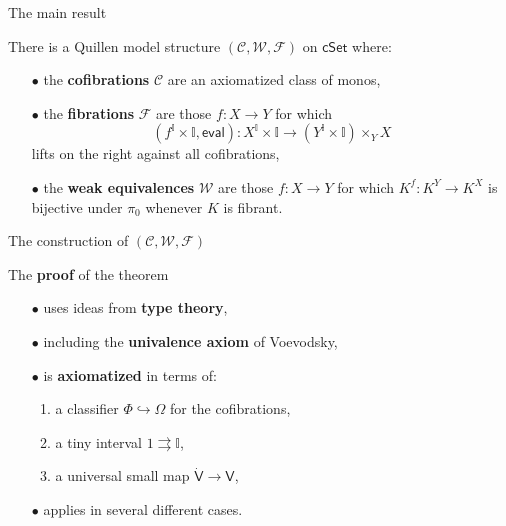 \documentclass[handout]{beamer}
\newcommand{\myemph}[1]{\textbf{#1}}    %
\newcommand{\C}{\ensuremath{\mathbb{C}}}
\newcommand{\Set}{\ensuremath{\mathsf{Set}}}
\newcommand{\cSet}{\ensuremath{\mathsf{cSet}}}
\newcommand{\ra}{\ensuremath{\rightarrow}}
\newcommand{\V}{\mathsf{V}}
\newcommand{\II}{\mathbb{I}}
\theoremstyle{remark}
\begin{document}
\begin{frame}{The main result}

\begin{theorem}[A.~2023]
There is a Quillen model structure $(\mathcal{C},\mathcal{W},\mathcal{F})$ on $\mathsf{cSet}$ where:
\begin{itemize}
\item[$\bullet$] the \myemph{cofibrations} $\mathcal{C}$ are an axiomatized class of monos, 
\item[$\bullet$] the \myemph{fibrations} $\mathcal{F}$ are those $f :X\ra Y$ for which 
\[
(f^\mathbb{I}\times \mathbb{I}, \mathsf{eval}) : X^\mathbb{I} \times \mathbb{I} \to (Y^\mathbb{I}\times\mathbb{I})\times_Y X
\]
lifts on the right against all cofibrations,
\item[$\bullet$] the \myemph{weak equivalences} $\mathcal{W}$  are those $f: X\ra Y$ for which $K^f : K^Y \to K^X$ is bijective under $\pi_0$ whenever $K$ is fibrant.
\end{itemize}
\end{theorem}

\end{frame}
\begin{frame}{The construction of $(\mathcal{C},\mathcal{W},\mathcal{F})$}

The \myemph{proof} of the theorem
\begin{itemize}
\item[$\bullet$] uses ideas from \myemph{type theory},
\item[$\bullet$] including the \myemph{univalence axiom} of Voevodsky,
\item[$\bullet$]  is \myemph{axiomatized} in terms of:
	\begin{enumerate}
	\item a classifier $\Phi \hookrightarrow \Omega$ for the cofibrations, 
	\item a tiny interval $1\rightrightarrows\II$, 
	\item a universal small map $\dot{\V}\ra\V$,
	\end{enumerate}
\item[$\bullet$]  applies in several different cases.
\end{itemize}
\end{frame}
\end{document}
